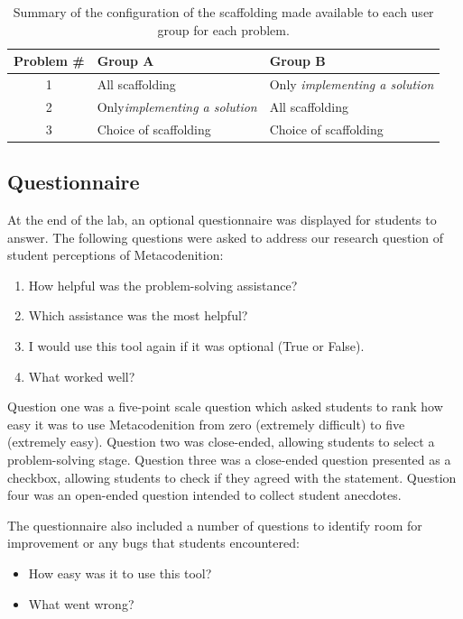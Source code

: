 \documentclass[sigconf,authorversion,nonacm]{acmart}
\begin{document}
\begin{table}
  \caption{Summary of the configuration of the scaffolding made available to each user group for each problem.}
  \label{tab:scaffoldingConfig}
  \begin{tabular}{c|p{30mm}|p{30mm}}
    \toprule
   Problem \#&Group A&Group B \\
    \midrule
    1&All scaffolding&Only \emph{implementing a solution} \\
    \midrule
    2&Only\emph{implementing a solution}&All scaffolding \\
    \midrule
    3&Choice of scaffolding&Choice of scaffolding \\
    \bottomrule
  \end{tabular}
\end{table}

\subsection{Questionnaire}
At the end of the lab, an optional questionnaire was displayed for students to answer. The following questions were asked to address our research question of student perceptions of Metacodenition:
\begin{enumerate}
    \item How helpful was the problem-solving assistance?
    \item Which assistance was the most helpful?
    \item I would use this tool again if it was optional (True or False).
    \item What worked well?
\end{enumerate}
Question one was a five-point scale question which asked students to rank how easy it was to use Metacodenition from zero (extremely difficult) to five (extremely easy). Question two was close-ended, allowing students to select a problem-solving stage. Question three was a close-ended question presented as a checkbox, allowing students to check if they agreed with the statement. Question four was an open-ended question intended to collect student anecdotes.

The questionnaire also included a number of questions to identify room for improvement or any bugs that students encountered:
\begin{itemize}
    \item How easy was it to use this tool?
    \item What went wrong?
\end{itemize}
\end{document}
